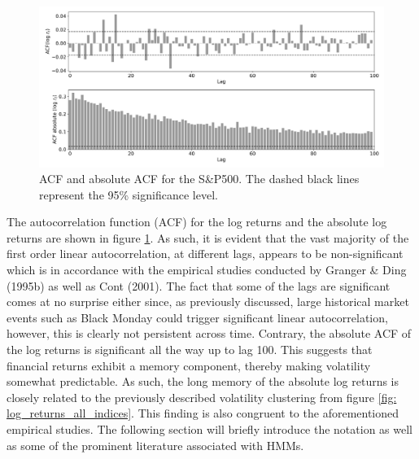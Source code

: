 \begin{figure}[H] 
    \centering
    \includegraphics[width=1\textwidth]{analysis/data_description/images/SP500_ACF.png}
    \caption[ACF and absolute ACF for the S\&P500]{ACF and absolute ACF for the S\&P500. The dashed black lines represent the 95\% significance level.}
    \label{fig: ACF_all_log_returns}
\end{figure}

The autocorrelation function (ACF) for the log returns and the absolute log returns are shown in figure \ref{fig: ACF_all_log_returns}. As such, it is evident that the vast majority of the first order linear autocorrelation, at different lags, appears to be non-significant which is in accordance with the empirical studies conducted by Granger \& Ding (1995b) as well as Cont (2001). The fact that some of the lags are significant comes at no surprise either since, as previously discussed, large historical market events such as Black Monday could trigger significant linear autocorrelation, however, this is clearly not persistent across time. Contrary, the absolute ACF of the log returns is significant all the way up to lag 100. This suggests that financial returns exhibit a memory component, thereby making volatility somewhat predictable. As such, the long memory of the absolute log returns is closely related to the previously described volatility clustering from figure \ref{fig: log_returns_all_indices}. This finding is also congruent to the aforementioned empirical studies. The following section will briefly introduce the notation as well as some of the prominent literature associated with HMMs.
